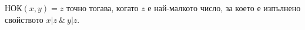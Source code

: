 


$\mbox{НОК}(x,y) = z$ точно тогава, когато
$z$ е най-малкото число, за което е изпълнено свойството $x | z\ \&\ y | z$.



